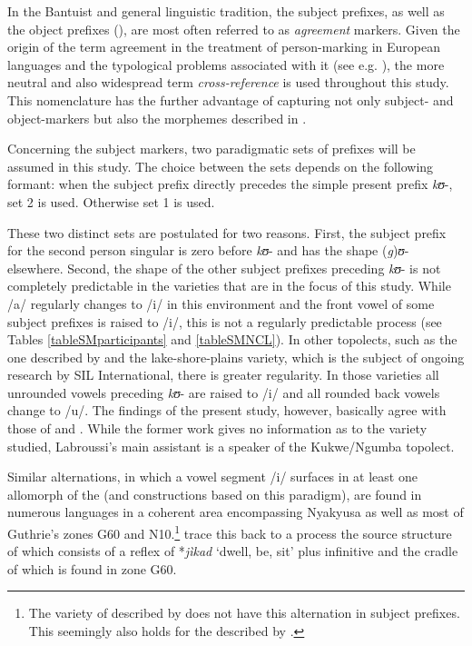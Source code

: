 In the Bantuist and general linguistic tradition, the subject prefixes, as well as the object prefixes (), are most often referred to as \textit{agreement} markers. Given the origin of the term agreement in the treatment of person-marking in European languages and the typological problems associated with it (see e.g. \citealt{HaspelmathM2013}), the more neutral and also widespread term \textit{cross-reference} is used throughout this study. This nomenclature has the further advantage of capturing not only subject- and object-markers but also the  morphemes described in .

Concerning the subject markers, two paradigmatic sets of prefixes will be assumed in this study. The choice between the sets depends on the following formant: when the subject prefix directly precedes the simple present prefix \textit{kʊ}-, set 2 is used. Otherwise set 1 is used.

These two distinct sets are postulated for two reasons. First, the subject prefix for the second person singular is zero before  \textit{kʊ}- and has the shape (\textit{g})\textit{ʊ}- elsewhere. Second, the shape of the other subject prefixes preceding \textit{kʊ}- is not completely predictable in the varieties that are in the focus of this study. While /a/ regularly changes to /i/ in this environment and the front vowel of some subject prefixes is raised to /i/, this is not a regularly predictable process (see Tables \ref{tableSMparticipants} and \ref{tableSMNCL}). In other topolects, such as the one described by \citet{BergerP1938} and the lake-shore-plains variety, which is the subject of ongoing research by SIL International, there is greater regularity. In those varieties all unrounded vowels preceding  \textit{kʊ}- are raised to /i/ and all rounded back vowels change to /u/. The findings of the present study, however, basically agree with those of \citet{MwangokaNVoorhoeveJ1960b} and \citet{LabroussiC1998}. While the former work gives no information as to the variety studied, Labroussi's main assistant is a speaker of the Kukwe/Ngumba topolect.

Similar alternations, in which a vowel segment /i/ surfaces in at least one allomorph of the  (and constructions based on this paradigm), are found in numerous languages in a coherent area encompassing Nyakyusa as well as most of Guthrie's zones G60 and N10.\footnote{The variety of  described by \citet{KishindoP1999} does not have this alternation in subject prefixes. This seemingly also holds for the  described by \citet{LabroussiC1998}.} \citet{PersohnBBernanderR2016} trace this back to a  process the source structure of which consists of a reflex of  *\textit{jìkad} \lq dwell, be, sit' plus infinitive and the cradle of which is found in zone G60. 

